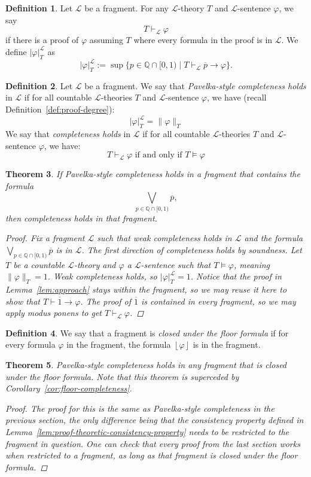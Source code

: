 \documentclass{amsart}
\newtheorem{theorem}{Theorem}[section]
\theoremstyle{definition}
\newtheorem{definition}[theorem]{Definition}
\numberwithin{equation}{theorem}
\renewcommand{\phi}{\varphi}
\newcommand{\Q}{\mathbb{Q}}
\newcommand{\where}{\mid}
\newcommand{\proves}{\vdash}
\newcommand{\strict}[1]{{\left\lfloor#1\right\rfloor}}
\newcommand{\rat}[1]{{\overline{#1}}}
\newcommand{\narrow}[1]{\xrightarrow{#1}}
\renewcommand{\to}{\narrow{}}
\newcommand{\frag}{\mathcal{L}}
\begin{document}
\begin{definition}
  Let $\frag$ be a fragment.
  For any $\frag$-theory $T$ and $\frag$-sentence $\phi$, we say
  \[
    T\proves_\frag\phi
  \]
  if there is a proof of $\phi$ assuming $T$ where every formula in the proof is in $\frag$.
  We define $|\phi|_T^\frag$ as
  \[
    |\phi|_T^\frag:=\sup\{p\in\Q\cap[0,1)\where T\proves_\frag \rat p\to\phi\}.
  \]
\end{definition}
\begin{definition}
  Let $\frag$ be a fragment.
  We say that \emph{Pavelka-style completeness holds} in $\frag$ if for all countable $\frag$-theories $T$ and $\frag$-sentence $\phi$, we have (recall Definition~\ref{def:proof-degree}):
  \[
    |\phi|_T^\frag=\|\phi\|_T
  \]
  We say that \emph{completeness holds} in $\frag$ if for all countable $\frag$-theories $T$ and $\frag$-sentence $\phi$, we have:
  \[
    T\proves_\frag\phi\text{ if and only if }T\models\phi
  \]
\end{definition}
\begin{theorem}
  If Pavelka-style completeness holds in a fragment that contains the formula 
  \[
    \bigvee_{p\in\Q\cap[0,1)}\rat p,
  \]
  then completeness holds in that fragment.
  \begin{proof}
    Fix a fragment $\frag$ such that weak completeness holds in $\frag$ and the formula $\bigvee_{p\in\Q\cap[0,1)}\rat p$ is in $\frag$.
    The first direction of completeness holds by soundness.
    Let $T$ be a countable $\frag$-theory and $\phi$ a $\frag$-sentence such that $T\models\phi$, meaning $\|\phi\|_T=1$.
    Weak completeness holds, so $|\phi|_T^\frag=1$.
    Notice that the proof in Lemma~\ref{lem:approach} stays within the fragment, so we may reuse it here to show that $T\proves\rat 1\to\phi$.
    The proof of $\rat 1$ is contained in every fragment, so we may apply modus ponens to get $T\proves_\frag\phi$.
  \end{proof}
\end{theorem}
\begin{definition}
  We say that a fragment is \emph{closed under the floor formula} if for every formula $\phi$ in the fragment, the formula $\strict{\phi}$ is in the fragment.
\end{definition}

\begin{theorem}
  Pavelka-style completeness holds in any fragment that is closed under the floor formula.
  Note that this theorem is superceded by Corollary~\ref{cor:floor-completeness}.
  \begin{proof}
    The proof for this is the same as Pavelka-style completeness in the previous section, the only difference being that the consistency property defined in Lemma~\ref{lem:proof-theoretic-consistency-property} needs to be restricted to the fragment in question.
    One can check that every proof from the last section works when restricted to a fragment, as long as that fragment is closed under the floor formula.
  \end{proof}
\end{theorem}
\end{document}

